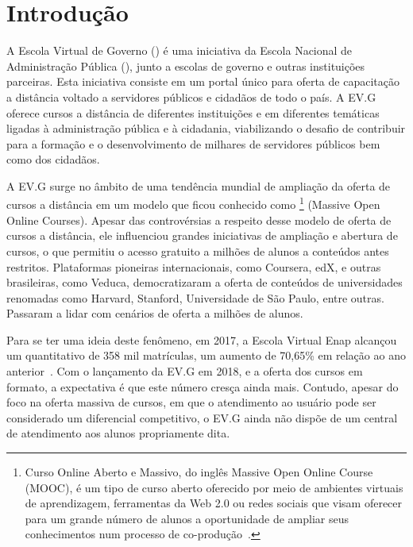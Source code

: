 \chapter{Introdução}\label{cap:01:introducao}

A Escola Virtual de Governo () é uma iniciativa da Escola Nacional de Administração Pública (), junto a escolas de governo e outras instituições parceiras.
Esta iniciativa consiste em um portal único para oferta de capacitação a distância voltado a servidores públicos e cidadãos de todo o país.
A EV.G oferece cursos a distância de diferentes instituições e em diferentes temáticas ligadas à administração pública e à cidadania, viabilizando o desafio de contribuir para a formação e o desenvolvimento de milhares de servidores públicos bem como dos cidadãos.

A EV.G surge no âmbito de uma tendência mundial de ampliação da oferta de cursos a distância em um modelo que ficou conhecido como \footnote{Curso Online Aberto e Massivo, do inglês Massive Open Online Course (MOOC), é um tipo de curso aberto oferecido por meio de ambientes virtuais de aprendizagem, ferramentas da Web 2.0 ou redes sociais que visam oferecer para um grande número de alunos a oportunidade de ampliar seus conhecimentos num processo de co-produção~\cite{Mooc}.} (Massive Open Online Courses). Apesar das controvérsias a respeito desse modelo de oferta de cursos a distância, ele influenciou grandes iniciativas de ampliação e abertura de cursos, o que permitiu o acesso gratuito a milhões de alunos a conteúdos antes restritos. Plataformas pioneiras internacionais, como Coursera, edX, e outras brasileiras, como Veduca, democratizaram a oferta de conteúdos de universidades renomadas como Harvard, Stanford, Universidade de São Paulo, entre outras. Passaram a lidar com cenários de oferta a milhões de alunos. 

Para se ter uma ideia deste fenômeno, em 2017, a Escola Virtual Enap alcançou um quantitativo de 358 mil matrículas, um aumento de 70,65\% em relação ao ano anterior~\cite{EVGnumeros}.
Com o lançamento da EV.G em 2018, e a oferta dos cursos em formato, a expectativa é que este número cresça ainda mais.
Contudo, apesar do foco na oferta massiva de cursos, em que o atendimento ao usuário pode ser considerado um diferencial competitivo, o EV.G ainda não dispõe de um central de atendimento aos alunos propriamente dita.

